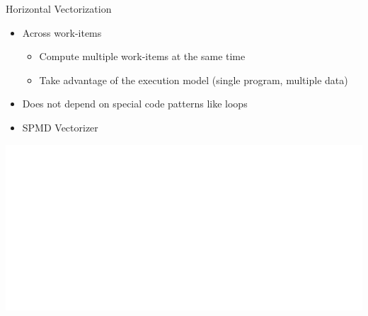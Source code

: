 \begin{frame}{Horizontal Vectorization}

\begin{itemize}
    \item Across work-items
    \begin{itemize}
        \item Compute multiple work-items at the same time
        \item Take advantage of the execution model (single program, multiple data)
    \end{itemize}
    \item Does not depend on special code patterns like loops
    \item SPMD Vectorizer
\end{itemize}

\vspace{3ex}
\hspace{0.55em}\includegraphics[scale=0.40]{images/horizontal-vectorization.pdf}

\end{frame}


